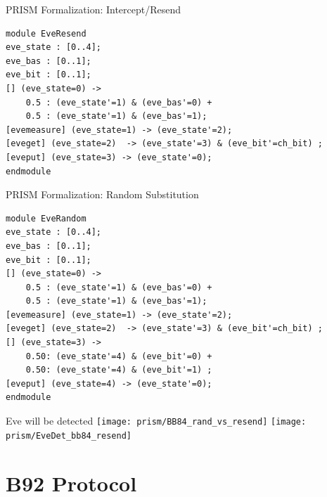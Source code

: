 \documentclass{beamer}
\begin{document}
\begin{frame}[fragile]{PRISM Formalization: Intercept/Resend}
\begin{footnotesize}
\begin{verbatim}
module EveResend
eve_state : [0..4];
eve_bas : [0..1];
eve_bit : [0..1];
[] (eve_state=0) -> 
    0.5 : (eve_state'=1) & (eve_bas'=0) + 
    0.5 : (eve_state'=1) & (eve_bas'=1);
[evemeasure] (eve_state=1) -> (eve_state'=2);
[eveget] (eve_state=2)  -> (eve_state'=3) & (eve_bit'=ch_bit) ;
[eveput] (eve_state=3) -> (eve_state'=0);
endmodule
\end{verbatim}
\end{footnotesize}
\end{frame}

\begin{frame}[fragile]{PRISM Formalization: Random Substitution}
\begin{footnotesize}
\begin{verbatim}
module EveRandom
eve_state : [0..4];
eve_bas : [0..1];
eve_bit : [0..1];
[] (eve_state=0) -> 
    0.5 : (eve_state'=1) & (eve_bas'=0) + 
    0.5 : (eve_state'=1) & (eve_bas'=1);
[evemeasure] (eve_state=1) -> (eve_state'=2);
[eveget] (eve_state=2)  -> (eve_state'=3) & (eve_bit'=ch_bit) ;
[] (eve_state=3) ->
    0.50: (eve_state'=4) & (eve_bit'=0) +
    0.50: (eve_state'=4) & (eve_bit'=1) ;
[eveput] (eve_state=4) -> (eve_state'=0);
endmodule
\end{verbatim}
\end{footnotesize}
\end{frame}

\begin{frame}{Eve will be detected}
\texttt{[image: prism/BB84\_rand\_vs\_resend]}
\pause
\texttt{[image: prism/EveDet\_bb84\_resend]}
\end{frame}


\section{B92 Protocol}
\end{document}
